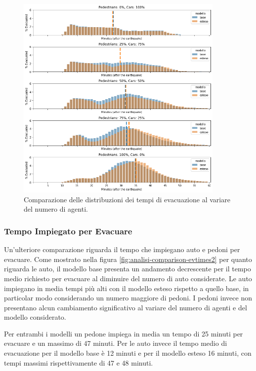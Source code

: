 \begin{figure}[ht]
    \centering
    \includegraphics[width=0.9\textwidth]{images/analisi/comparison-evtimes.png}
    \caption{Comparazione delle distribuzioni dei tempi di evacuazione al variare del numero di agenti.}
    \label{fig:analisi-comparison-evtimes}
\end{figure}

\pagebreak

\subsubsection*{Tempo Impiegato per Evacuare}
Un'ulteriore comparazione riguarda il tempo che impiegano auto e pedoni per evacuare.
Come mostrato nella figura \ref{fig:analisi-comparison-evtimes2} per quanto riguarda le auto,
il modello base presenta un andamento decrescente per il tempo medio richiesto per evacuare al diminuire del numero di auto considerate.
Le auto impiegano in media tempi più alti con il modello esteso rispetto a quello base, in particolar modo considerando un numero maggiore di pedoni.
%
I pedoni invece non presentano alcun cambiamento significativo al variare del numero di agenti e del modello considerato.

Per entrambi i modelli un pedone impiega in media un tempo di 25 minuti per evacuare e un massimo di 47 minuti.
Per le auto invece il tempo medio di evacuazione per il modello base è 12 minuti e per il modello esteso 16 minuti,
con tempi massimi rispettivamente di 47 e 48 minuti.

